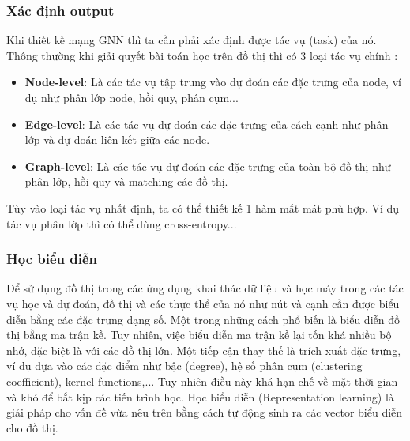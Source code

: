 \subsubsection{Xác định output}
\noindent Khi thiết kế mạng GNN thì ta cần phải xác định được tác vụ (task) của nó. Thông thường khi giải quyết bài toán học trên đồ thị thì có 3 loại tác vụ chính \cite{review:GNN, survey:GNN, survey:aug-for-dgl}:
\begin{itemize}
    \item \textbf{Node-level}: Là các tác vụ tập trung vào dự đoán các đặc trưng của node, ví dụ như phân lớp node, hồi quy, phân cụm...
    
    \item \textbf{Edge-level}: Là các tác vụ dự đoán các đặc trưng của cách cạnh như phân lớp và dự đoán liên kết giữa các node.
    
    \item \textbf{Graph-level}: Là các tác vụ dự đoán các đặc trưng của toàn bộ đồ thị như phân lớp, hồi quy và matching các đồ thị.
\end{itemize}
Tùy vào loại tác vụ nhất định, ta có thể thiết kế 1 hàm mất mát phù hợp. Ví dụ tác vụ phân lớp thì có thể dùng cross-entropy...

\subsubsection{Học biểu diễn} \label{2.2.2-reprensentation-learning}
\noindent Để sử dụng đồ thị trong các ứng dụng khai thác dữ liệu và học máy trong các tác vụ học và dự đoán, đồ thị và các thực thể của nó như nút và cạnh cần được biểu diễn bằng các đặc trưng dạng số. Một trong những cách phổ biến là biểu diễn đồ thị bằng ma trận kề. Tuy nhiên, việc biểu diễn ma trận kề lại tốn khá nhiều bộ nhớ, đặc biệt là với các đồ thị lớn. Một tiếp cận thay thế là trích xuất đặc trưng, ví dụ dựa vào các đặc điểm như bậc (degree), hệ số phân cụm (clustering coefficient), kernel functions,... Tuy nhiên điều này khá hạn chế về mặt thời gian và khó để bắt kịp các tiến trình học. Học biểu diễn (Representation learning) \cite{survey:graph-rep-learning} là giải pháp cho vấn đề vừa nêu trên bằng cách tự động sinh ra các vector biểu diễn cho đồ thị.



